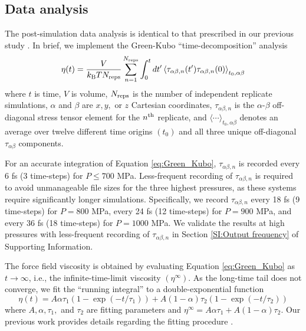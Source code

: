 \documentclass[preprint,review,12pt]{elsarticle}
\begin{document}
	\subsection{Data analysis}
	
	The post-simulation data analysis is identical to that prescribed in our previous study \cite{Postdoc_3}. In brief, we implement the Green-Kubo ``time-decomposition'' analysis \cite{Maginn2018,Zhang2015}
	\begin{equation} \label{eq:Green_Kubo}
	\eta(t) = \frac{V}{k_{\rm B} T N_{\rm reps}} \sum_{n=1}^{N_{\rm reps}} \int_{0}^{t}dt'\left\langle \tau_{\alpha\beta,n}(t') \tau_{\alpha\beta,n}(0)\right\rangle_{t_0,\alpha\beta}
	\end{equation} 
	where $t$ is time, $V$ is volume, $N_{\rm reps}$ is the number of independent replicate simulations, $\alpha$ and $\beta$ are $x, y, $ or $z$ Cartesian coordinates, $\tau_{\alpha\beta,n}$ is the $\alpha$-$\beta$ off-diagonal stress tensor element for the $n^{\rm th}$ replicate, and $\langle \cdots \rangle_{t_0,\alpha\beta}$ denotes an average over twelve different time origins $(t_0)$ and all three unique off-diagonal $\tau_{\alpha\beta}$ components. 
	
	For an accurate integration of Equation \ref{eq:Green_Kubo}, $\tau_{\alpha\beta,n}$ is recorded every 6 fs (3 time-steps) for $P \le 700$ MPa. Less-frequent recording of $\tau_{\alpha\beta,n}$ is required to avoid unmanageable file sizes for the three highest pressures, as these systems require significantly longer simulations. Specifically, we record $\tau_{\alpha\beta,n}$ every 18 fs (9 time-steps) for $P = 800$ MPa, every 24 fs (12 time-steps) for $P = 900$ MPa, and every 36 fs (18 time-steps) for $P = 1000$ MPa. We validate the results at high pressures with less-frequent recording of $\tau_{\alpha\beta,n}$ in Section \ref{SI:Output frequency} of Supporting Information.  
	
	
	
	The force field viscosity is obtained by evaluating Equation \ref{eq:Green_Kubo} as $t \rightarrow \infty$, i.e., the infinite-time-limit viscosity $(\eta^\infty)$. As the long-time tail does not converge, we fit the ``running integral'' to a double-exponential function
	\begin{equation} \label{eq: Double exponential}
	\eta(t) = A \alpha \tau_1 \left(1-\exp{(-t/\tau_1)}\right) + A (1-\alpha) \tau_2 \left(1-\exp{(-t/\tau_2)}\right)
	\end{equation}
	where $A, \alpha, \tau_1, $ and $\tau_2$ are fitting parameters and $\eta^\infty = A \alpha \tau_1 + A (1-\alpha) \tau_2$. Our previous work provides details regarding the fitting procedure \cite{Postdoc_3}. 
	
\end{document}
